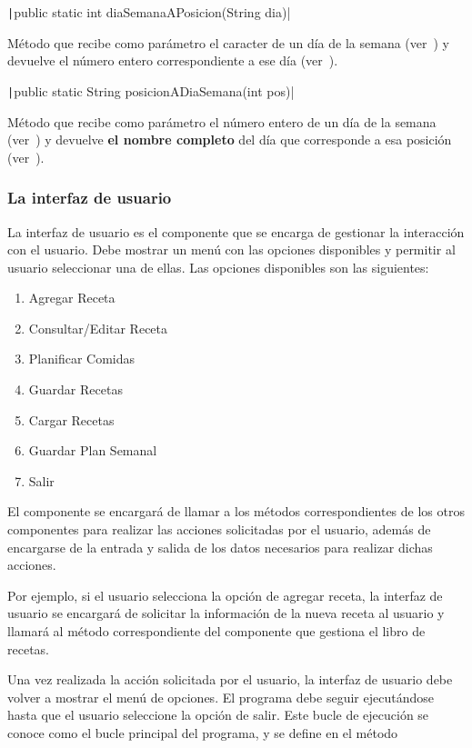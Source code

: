 \documentclass[
    a4paper, %
    12pt, %
]{CSSullivanBusinessReport}
\begin{document}
\texttt|public static int diaSemanaAPosicion(String dia)|

Método que recibe como parámetro el caracter de un día de la semana (ver~) y devuelve el número entero correspondiente a ese día (ver~).

\texttt|public static String posicionADiaSemana(int pos)|

Método que recibe como parámetro el número entero de un día de la semana (ver~) y devuelve \textbf{el nombre completo} del día que corresponde a esa posición (ver~).

\subsubsection{La interfaz de usuario}\label{sec:interfaz-usuario}
La interfaz de usuario es el componente que se encarga de gestionar la interacción con el usuario. Debe mostrar un menú con las opciones disponibles y permitir al usuario seleccionar una de ellas. Las opciones disponibles son las siguientes:

\begin{enumerate}
    \item Agregar Receta
    \item Consultar/Editar Receta
    \item Planificar Comidas
    \item Guardar Recetas
    \item Cargar Recetas
    \item Guardar Plan Semanal
    \item Salir
\end{enumerate}

El componente se encargará de llamar a los métodos correspondientes de los otros componentes para realizar las acciones solicitadas por el usuario, además de encargarse de la entrada y salida de los datos necesarios para realizar dichas acciones.

Por ejemplo, si el usuario selecciona la opción de agregar receta, la interfaz de usuario se encargará de solicitar la información de la nueva receta al usuario y llamará al método correspondiente del componente que gestiona el libro de recetas.

Una vez realizada la acción solicitada por el usuario, la interfaz de usuario debe volver a mostrar el menú de opciones. El programa debe seguir ejecutándose hasta que el usuario seleccione la opción de salir. Este bucle de ejecución se conoce como el bucle principal del programa, y se define en el método
\end{document}
